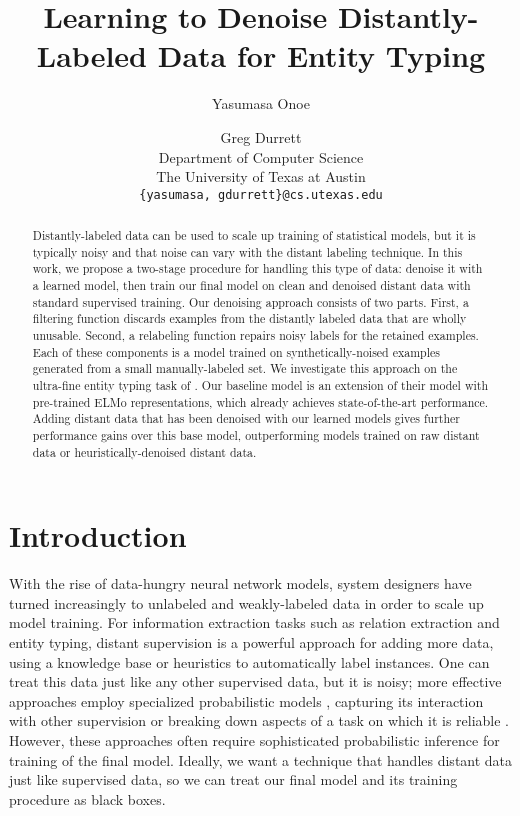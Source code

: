 \documentclass[11pt,a4paper]{article}
\title{Learning to Denoise Distantly-Labeled Data for Entity Typing}
\author{Yasumasa Onoe \and Greg Durrett\\
  Department of Computer Science \\
  The University of Texas at Austin \\
  {\tt\{yasumasa, gdurrett\}@cs.utexas.edu}}
\date{}
\begin{document}
\maketitle
\begin{abstract}
Distantly-labeled data can be used to scale up training of statistical models, but it is typically noisy and that noise can vary with the distant labeling technique. In this work, we propose a two-stage procedure for handling this type of data: denoise it with a learned model, then train our final model on clean and denoised distant data with standard supervised training. Our denoising approach consists of two parts. First, a filtering function discards examples from the distantly labeled data that are wholly unusable. Second, a relabeling function repairs noisy labels for the retained examples. Each of these components is a model trained on synthetically-noised examples generated from a small manually-labeled set.  We investigate this approach on the ultra-fine entity typing task of \citet{Eunsol_Choi_18}. Our baseline model is an extension of their model with pre-trained ELMo representations, which already achieves state-of-the-art performance. Adding distant data that has been denoised with our learned models gives further performance gains over this base model, outperforming models trained on raw distant data or heuristically-denoised distant data.

\end{abstract}




\section{Introduction}\label{intro}

With the rise of data-hungry neural network models, system designers have turned increasingly to unlabeled and weakly-labeled data in order to scale up model training. For information extraction tasks such as relation extraction and entity typing, distant supervision \cite{Mike_Mintz_09} is a powerful approach for adding more data, using a knowledge base \cite{delcorro-EtAl:2015:EMNLP,rabinovich-klein:2017:Short} or heuristics \cite{ratner16-data-programming,hancock2018} to automatically label instances. One can treat this data just like any other supervised data, but it is noisy; more effective approaches employ specialized probabilistic models \cite{Sebastian_Riedel10,ratner-snorkel}, capturing its interaction with other supervision \cite{Hai_Wang_18} or breaking down aspects of a task on which it is reliable \cite{Alexander_Ratner_18}. However, these approaches often require sophisticated probabilistic inference for training of the final model. Ideally, we want a technique that handles distant data just like supervised data, so we can treat our final model and its training procedure as black boxes.
\end{document}
